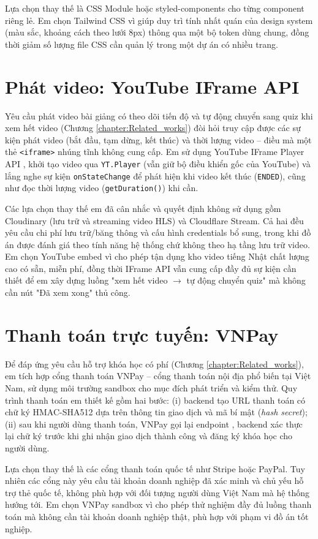 \documentclass[../DoAn.tex]{subfiles}
\begin{document}
Lựa chọn thay thế là CSS Module hoặc styled-components cho từng component riêng lẻ. Em chọn Tailwind CSS vì giúp duy trì tính nhất quán của design system (màu sắc, khoảng cách theo lưới 8px) thông qua một bộ token dùng chung, đồng thời giảm số lượng file CSS cần quản lý trong một dự án có nhiều trang.

\section{Phát video: YouTube IFrame API}
\label{section:3.6}

Yêu cầu phát video bài giảng có theo dõi tiến độ và tự động chuyển sang quiz khi xem hết video (Chương \ref{chapter:Related_works}) đòi hỏi truy cập được các sự kiện phát video (bắt đầu, tạm dừng, kết thúc) và thời lượng video -- điều mà một thẻ \texttt{<iframe>} nhúng tĩnh không cung cấp. Em sử dụng YouTube IFrame Player API \cite{youtubeapi}, khởi tạo video qua \texttt{YT.Player} (vẫn giữ bộ điều khiển gốc của YouTube) và lắng nghe sự kiện \texttt{onStateChange} để phát hiện khi video kết thúc (\texttt{ENDED}), cũng như đọc thời lượng video (\texttt{getDuration()}) khi cần.

Các lựa chọn thay thế em đã cân nhắc và quyết định không sử dụng gồm Cloudinary (lưu trữ và streaming video HLS) và Cloudflare Stream. Cả hai đều yêu cầu chi phí lưu trữ/băng thông và cấu hình credentials bổ sung, trong khi đồ án được đánh giá theo tính năng hệ thống chứ không theo hạ tầng lưu trữ video. Em chọn YouTube embed vì cho phép tận dụng kho video tiếng Nhật chất lượng cao có sẵn, miễn phí, đồng thời IFrame API vẫn cung cấp đầy đủ sự kiện cần thiết để em xây dựng luồng "xem hết video \(\to\) tự động chuyển quiz" mà không cần nút "Đã xem xong" thủ công.

\section{Thanh toán trực tuyến: VNPay}
\label{section:3.7}

Để đáp ứng yêu cầu hỗ trợ khóa học có phí (Chương \ref{chapter:Related_works}), em tích hợp cổng thanh toán VNPay \cite{vnpaydocs} -- cổng thanh toán nội địa phổ biến tại Việt Nam, sử dụng môi trường sandbox cho mục đích phát triển và kiểm thử. Quy trình thanh toán em thiết kế gồm hai bước: (i) backend tạo URL thanh toán có chữ ký HMAC-SHA512 dựa trên thông tin giao dịch và mã bí mật (\textit{hash secret}); (ii) sau khi người dùng thanh toán, VNPay gọi lại endpoint \texttt{}, backend xác thực lại chữ ký trước khi ghi nhận giao dịch thành công và đăng ký khóa học cho người dùng.

Lựa chọn thay thế là các cổng thanh toán quốc tế như Stripe hoặc PayPal. Tuy nhiên các cổng này yêu cầu tài khoản doanh nghiệp đã xác minh và chủ yếu hỗ trợ thẻ quốc tế, không phù hợp với đối tượng người dùng Việt Nam mà hệ thống hướng tới. Em chọn VNPay sandbox vì cho phép thử nghiệm đầy đủ luồng thanh toán mà không cần tài khoản doanh nghiệp thật, phù hợp với phạm vi đồ án tốt nghiệp.
\end{document}

